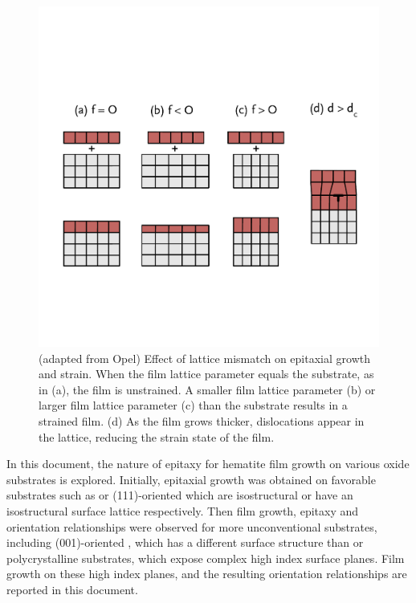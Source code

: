 \begin{figure}
	\includegraphics[width=\textwidth]{filmgrowth.pdf}
		\caption[Strain in thin film growth]{%
			(adapted from Opel\citep{Opel:2012ge}) Effect of lattice mismatch 
			on epitaxial growth and strain.
			When the film lattice parameter equals the substrate, as in (a),
			the film is unstrained. A smaller film lattice parameter (b) or
			larger film lattice parameter (c) than the substrate results in
			a strained film. (d) As the film grows thicker, dislocations appear
			in the lattice, reducing the strain state of the film.}
	\label{fig:filmgrowth}
\end{figure}

In this document, the nature of epitaxy for hematite film growth on various oxide
substrates is explored. Initially, epitaxial growth was obtained on favorable substrates
such as  or (111)-oriented  which are isostructural or have an
isostructural surface lattice respectively. Then film growth, epitaxy and orientation
relationships were observed for more unconventional substrates, including (001)-oriented
, which has a different surface structure than  or polycrystalline
substrates, which expose complex high index surface planes. Film growth on these high
index planes, and the resulting orientation relationships are reported in this document.

